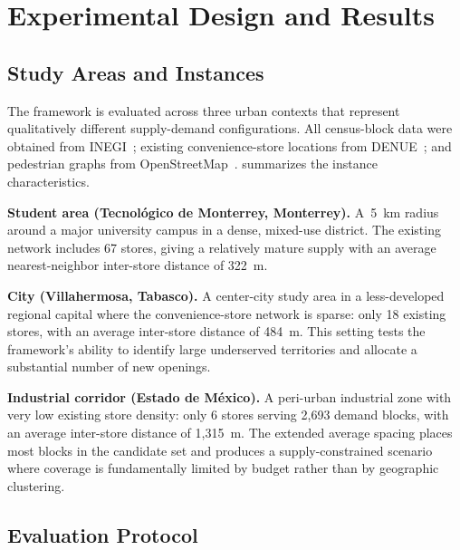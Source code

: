 \section{Experimental Design and Results}
\label{sec:experiments}

\subsection{Study Areas and Instances}
\label{ssec:instances}

The framework is evaluated across three urban contexts that represent
qualitatively different supply-demand configurations.
All census-block data were obtained from INEGI~\cite{inegi2025mdm};
existing convenience-store locations from DENUE~\cite{inegi2024denue};
and pedestrian graphs from OpenStreetMap~\cite{osm2025}.
 summarizes the instance characteristics.

\textbf{Student area (Tecnológico de Monterrey, Monterrey).}
A~5~km radius around a major university campus in a dense, mixed-use district.
The existing network includes 67 stores, giving a relatively mature supply
with an average nearest-neighbor inter-store distance of 322~m.

\textbf{City (Villahermosa, Tabasco).}
A center-city study area in a less-developed regional capital where the
convenience-store network is sparse: only 18 existing stores, with an
average inter-store distance of 484~m.
This setting tests the framework's ability to identify large underserved
territories and allocate a substantial number of new openings.

\textbf{Industrial corridor (Estado de México).}
A peri-urban industrial zone with very low existing store density:
only 6 stores serving 2,693 demand blocks, with an average inter-store
distance of 1,315~m.
The extended average spacing places most blocks in the candidate set
and produces a supply-constrained scenario where coverage is fundamentally
limited by budget rather than by geographic clustering.

\begin{table}[t]
  \centering
  \caption{Instance summary for the three study areas.}
  \label{tab:instances}
  
\end{table}

\subsection{Evaluation Protocol}
\label{ssec:protocol}

